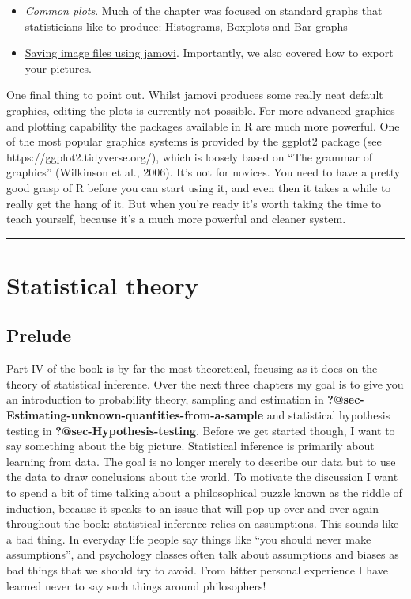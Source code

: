\documentclass[
  letterpaper,
]{book}
\providecommand{\tightlist}{%
  \setlength{\itemsep}{0pt}\setlength{\parskip}{0pt}}\usepackage{longtable,booktabs,array}
\begin{document}
\begin{itemize}
\tightlist
\item
  \emph{Common plots}. Much of the chapter was focused on standard
  graphs that statisticians like to produce:
  \protect\hyperlink{sec-Histograms}{Histograms},
  \protect\hyperlink{boxplots}{Boxplots} and
  \protect\hyperlink{sec-Bar-graphs}{Bar graphs}
\item
  \protect\hyperlink{saving-image-files-using-jamovi}{Saving image files
  using jamovi}. Importantly, we also covered how to export your
  pictures.
\end{itemize}

One final thing to point out. Whilst jamovi produces some really neat
default graphics, editing the plots is currently not possible. For more
advanced graphics and plotting capability the packages available in R
are much more powerful. One of the most popular graphics systems is
provided by the ggplot2 package (see https://ggplot2.tidyverse.org/),
which is loosely based on ``The grammar of graphics'' (Wilkinson et al.,
2006). It's not for novices. You need to have a pretty good grasp of R
before you can start using it, and even then it takes a while to really
get the hang of it. But when you're ready it's worth taking the time to
teach yourself, because it's a much more powerful and cleaner system.

\begin{center}\rule{0.5\linewidth}{0.5pt}\end{center}

\part{Statistical theory}

\hypertarget{prelude}{%
\chapter*{Prelude}\label{prelude}}

Part IV of the book is by far the most theoretical, focusing as it does
on the theory of statistical inference. Over the next three chapters my
goal is to give you an introduction to probability theory, sampling and
estimation in \textbf{?@sec-Estimating-unknown-quantities-from-a-sample}
and statistical hypothesis testing in \textbf{?@sec-Hypothesis-testing}.
Before we get started though, I want to say something about the big
picture. Statistical inference is primarily about learning from data.
The goal is no longer merely to describe our data but to use the data to
draw conclusions about the world. To motivate the discussion I want to
spend a bit of time talking about a philosophical puzzle known as the
riddle of induction, because it speaks to an issue that will pop up over
and over again throughout the book: statistical inference relies on
assumptions. This sounds like a bad thing. In everyday life people say
things like ``you should never make assumptions'', and psychology
classes often talk about assumptions and biases as bad things that we
should try to avoid. From bitter personal experience I have learned
never to say such things around philosophers!
\end{document}
